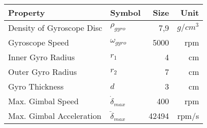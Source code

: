 \documentclass{standalone}
\begin{document}
\begin{tabular}{llrr}\toprule
    \textbf{Property}
        & \textbf{Symbol}
        & \textbf{Size}
        & \textbf{Unit}\\
    \midrule
    Density of Gyroscope Disc & $\rho_{gyro}$ & 7,9 & $g/cm^3$ \\
    Gyroscope Speed & $\omega_{gyro}$ & 5000 & rpm \\
    Inner Gyro Radius & $r_1$ & 4 & cm \\
    Outer Gyro Radius & $r_2$ & 7 & cm \\
    Gyro Thickness & $d$ & 3 & cm \\
    Max. Gimbal Speed & $\dot{\delta}_{max}$ & 400 & rpm \\
    Max. Gimbal Acceleration & $\ddot{\delta}_{max}$ & 42494 & rpm/s \\
    \bottomrule
\end{tabular}
\end{document}
